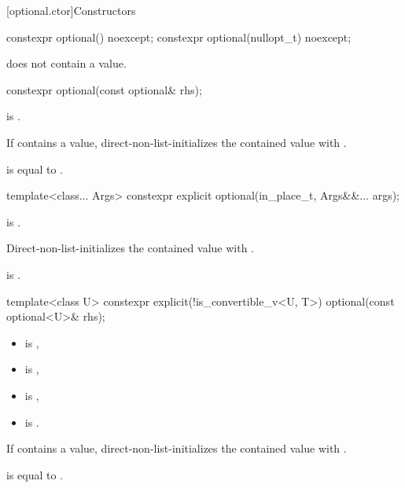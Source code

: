 [optional.ctor]{Constructors}

%
\begin{itemdecl}
constexpr optional() noexcept;
constexpr optional(nullopt_t) noexcept;
\end{itemdecl}

\begin{itemdescr}
\pnum
\ensures
{} does not contain a value.
\end{itemdescr}

%
\begin{itemdecl}
constexpr optional(const optional& rhs);
\end{itemdecl}

\begin{itemdescr}
\pnum
\constraints
{} is .

\pnum
\effects
If  contains a value, direct-non-list-initializes the contained value with .

\pnum
\ensures
{} is equal to .
\end{itemdescr}

%
\begin{itemdecl}
template<class... Args>
  constexpr explicit optional(in_place_t, Args&&... args);
\end{itemdecl}

\begin{itemdescr}
\pnum
\constraints
{} is .

\pnum
\effects
Direct-non-list-initializes the contained value with .

\pnum
\ensures
{} is .
\end{itemdescr}

%
\begin{itemdecl}
template<class U>
  constexpr explicit(!is_convertible_v<U, T>) optional(const optional<U>& rhs);
\end{itemdecl}

\begin{itemdescr}
\pnum
\constraints
\begin{itemize}
\item {} is ,
\item {} is ,
\item {} is ,
\item {} is .
\end{itemize}

\pnum
\effects
If  contains a value, direct-non-list-initializes the contained value with .

\pnum
\ensures
{} is equal to .
\end{itemdescr}
